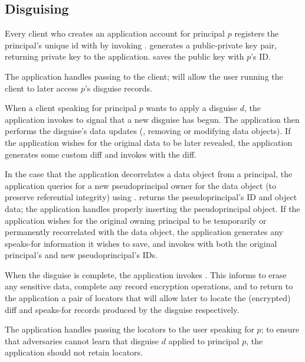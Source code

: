 \subsection{Disguising}

Every client who creates an application account for principal $p$ registers the principal's unique id
with \sys by invoking . \sys generates a public-private key pair, returning private key  to the
application. \sys saves the public key  with $p$'s ID.

The application handles passing  to the client;  will allow the user running the
client to later access $p$'s disguise records.

When a client speaking for principal $p$ wants to apply a disguise $d$,
the application invokes  to signal \sys that a new disguise has begun.
The application then performs the disguise's data updates (\eg, removing or modifying
data objects). If the application wishes for the original data to be later revealed, the
application generates some custom diff and invokes  with the diff.

In the case that the application decorrelates a data object from a principal, the application
queries \sys for a new pseudoprincipal owner for the data object (to preserve referential integrity)
using . \sys returns the pseudoprincipal's ID and object data; the
application handles properly inserting the pseudoprincipal object.  If the application wishes for
the original owning principal to be temporarily or permanently recorrelated with the data object,
the application generates any speaks-for information it wishes to save, and invokes
 with both the original principal's and new pseudoprincipal's IDs.

When the disguise is complete, the application invokes . This informs \sys to erase
any sensitive data, complete any record encryption operations, and to return to the application a
pair of locators that will allow \sys later to locate the (encrypted) diff and speaks-for records
produced by the disguise respectively.

The application handles passing the locators  to the user speaking for $p$; to ensure that
adversaries cannot learn that disguise $d$ applied to principal $p$, the application should not
retain locators.

